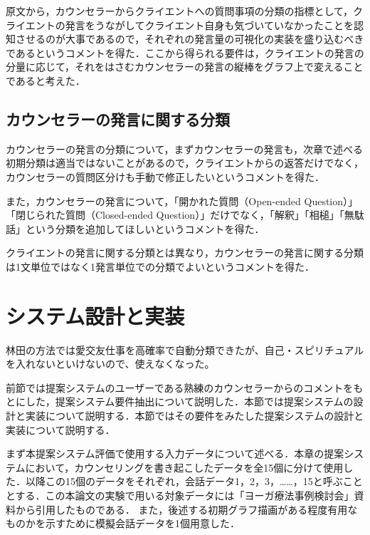 \documentclass[shuuron]{kuee}
\begin{document}
原文から，カウンセラーからクライエントへの質問事項の分類の指標として，クライエントの発言をうながしてクライエント自身も気づいていなかったことを認知させるのが大事であるので，それぞれの発言量の可視化の実装を盛り込むべきであるというコメントを得た．ここから得られる要件は，クライエントの発言の分量に応じて，それをはさむカウンセラーの発言の縦棒をグラフ上で変えることであると考えた．

\subsection{カウンセラーの発言に関する分類}

カウンセラーの発言の分類について，まずカウンセラーの発言も，次章で述べる初期分類は適当ではないことがあるので，クライエントからの返答だけでなく，カウンセラーの質問区分けも手動で修正したいというコメントを得た．

また，カウンセラーの発言について，「開かれた質問（Open-ended Question）」「閉じられた質問（Closed-ended Question）」だけでなく，「解釈」「相槌」「無駄話」という分類を追加してほしいというコメントを得た．

クライエントの発言に関する分類とは異なり，カウンセラーの発言に関する分類は1文単位ではなく1発言単位での分類でよいというコメントを得た．







\section{システム設計と実装}



  林田の方法では愛交友仕事を高確率で自動分類できたが、自己・スピリチュアルを入れないといけないので、使えなくなった。

前節では提案システムのユーザーである熟練のカウンセラーからのコメントをもとにした，提案システム要件抽出について説明した．本節では提案システムの設計と実装について説明する．本節ではその要件をみたした提案システムの設計と実装について説明する．

まず本提案システム評価で使用する入力データについて述べる．本章の提案システムにおいて，カウンセリングを書き起こしたデータを全15個に分けて使用した．以降この15個のデータをそれぞれ，会話データ1，2，3，……，15と呼ぶこととする．この本論文の実験で用いる対象データには「ヨーガ療法事例検討会」資料から引用したものである．
また，後述する初期グラフ描画がある程度有用なものかを示すために模擬会話データを1個用意した．
\end{document}
